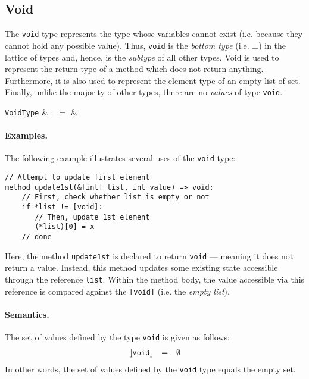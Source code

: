 \subsection{Void}

The \lstinline{void} type represents the type whose variables cannot exist (i.e. because they cannot hold any possible value).  Thus, \lstinline{void} is the {\em bottom type} (i.e. $\bot$) in the lattice of types and, hence, is the {\em subtype} of all other types.  Void is used to represent the return type of a method which does not return anything.  Furthermore, it is also used to represent the element type of an empty list of set.  Finally, unlike the majority of other types, there are no {\em values} of type \lstinline{void}.

\begin{syntax}
   \verb+VoidType+ & $::=$ &  \\
\end{syntax}

\paragraph{Examples.} The following example illustrates several uses of the \lstinline{void} type:

\begin{lstlisting}
// Attempt to update first element
method update1st(&[int] list, int value) => void:
    // First, check whether list is empty or not
    if *list != [void]:
       // Then, update 1st element
       (*list)[0] = x
    // done
\end{lstlisting}

Here, the method \lstinline{update1st} is declared to return
\lstinline{void} --- meaning it does not return a value.  Instead,
this method updates some existing state accessible through the
reference \lstinline{list}.  Within the method body, the value
accessible via this reference is compared against the
\lstinline{[void]} (i.e. the {\em empty list}).

\paragraph{Semantics.}  The set of values defined by the type
\lstinline{void} is given as follows:
\begin{displaymath}
\begin{array}{rcl}
\llbracket{\tt void}\rrbracket & = & \emptyset\\
\end{array}
\end{displaymath}
In other words, the set of values defined by the \lstinline{void} type
equals the empty set.  

